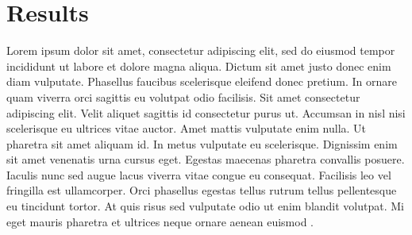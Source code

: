 \documentclass[letterpaper,10pt]{article}
\begin{document}
\section{Results}
Lorem ipsum dolor sit amet, consectetur adipiscing elit, sed do eiusmod tempor incididunt ut labore et dolore magna aliqua. Dictum sit amet justo donec enim diam vulputate. Phasellus faucibus scelerisque eleifend donec pretium. In ornare quam viverra orci sagittis eu volutpat odio facilisis. Sit amet consectetur adipiscing elit. Velit aliquet sagittis id consectetur purus ut. Accumsan in nisl nisi scelerisque eu ultrices vitae auctor. Amet mattis vulputate enim nulla. Ut pharetra sit amet aliquam id. In metus vulputate eu scelerisque. Dignissim enim sit amet venenatis urna cursus eget. Egestas maecenas pharetra convallis posuere. Iaculis nunc sed augue lacus viverra vitae congue eu consequat. Facilisis leo vel fringilla est ullamcorper. Orci phasellus egestas tellus rutrum tellus pellentesque eu tincidunt tortor. At quis risus sed vulputate odio ut enim blandit volutpat. Mi eget mauris pharetra et ultrices neque ornare aenean euismod \cite{Han2022}.






\end{document}
